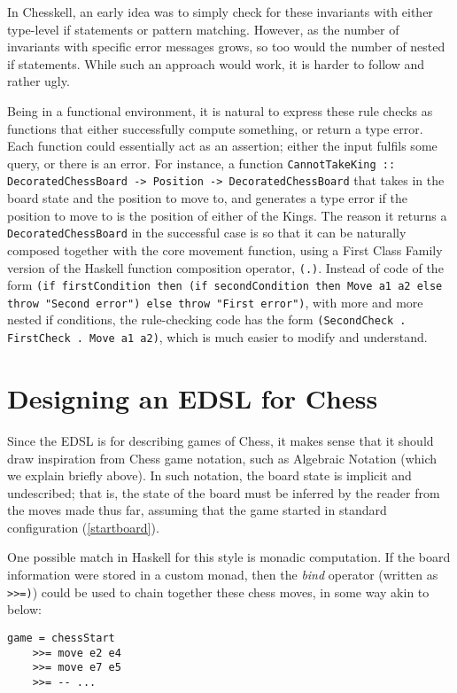 \documentclass[12pt, a4paper, bibliography=totocnumbered]{scrreprt}
\newcommand{\inline}[1]{\lstinline[basicstyle=\ttfamily\footnotesize]{#1}}
\begin{document}
In Chesskell, an early idea was to simply check for these invariants with either type-level if statements or pattern matching. However, as the number of invariants with specific error messages grows, so too would the number of nested if statements. While such an approach would work, it is harder to follow and rather ugly.

Being in a functional environment, it is natural to express these rule checks as functions that either successfully compute something, or return a type error. Each function could essentially act as an assertion; either the input fulfils some query, or there is an error. For instance, a function \inline{CannotTakeKing :: DecoratedChessBoard -> Position -> DecoratedChessBoard} that takes in the board state and the position to move to, and generates a type error if the position to move to is the position of either of the Kings. The reason it returns a \inline{DecoratedChessBoard} in the successful case is so that it can be naturally composed together with the core movement function, using a First Class Family version of the Haskell function composition operator, \inline{(.)}. Instead of code of the form \inline{(if firstCondition then (if secondCondition then Move a1 a2 else throw "Second error") else throw "First error")}, with more and more nested if conditions, the rule-checking code has the form \inline{(SecondCheck . FirstCheck . Move a1 a2)}, which is much easier to modify and understand.

\section{Designing an EDSL for Chess}

Since the EDSL is for describing games of Chess, it makes sense that it should draw inspiration from Chess game notation, such as Algebraic Notation (which we explain briefly above). In such notation, the board state is implicit and undescribed; that is, the state of the board must be inferred by the reader from the moves made thus far, assuming that the game started in standard configuration (\cref{startboard}).

One possible match in Haskell for this style is monadic computation. If the board information were stored in a custom monad, then the \emph{bind} operator (written as \inline{>>=)}) could be used to chain together these chess moves, in some way akin to below:

\begin{lstlisting}
game = chessStart
    >>= move e2 e4
    >>= move e7 e5
    >>= -- ...
\end{lstlisting}
\end{document}
